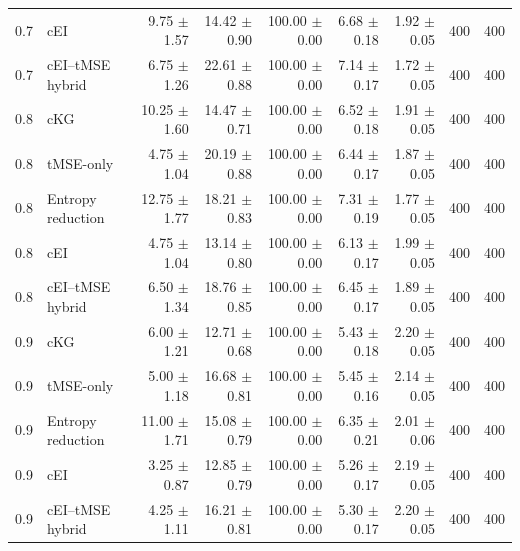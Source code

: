 \begin{tabular}{@{}clrrrrrrr@{}}
0.7 & cEI & 9.75 $\pm$ 1.57 & 14.42 $\pm$ 0.90 & 100.00 $\pm$ 0.00 & 6.68 $\pm$ 0.18 & 1.92 $\pm$ 0.05 & 400 & 400 \\
0.7 & cEI--tMSE hybrid & 6.75 $\pm$ 1.26 & 22.61 $\pm$ 0.88 & 100.00 $\pm$ 0.00 & 7.14 $\pm$ 0.17 & 1.72 $\pm$ 0.05 & 400 & 400 \\
0.8 & cKG & 10.25 $\pm$ 1.60 & 14.47 $\pm$ 0.71 & 100.00 $\pm$ 0.00 & 6.52 $\pm$ 0.18 & 1.91 $\pm$ 0.05 & 400 & 400 \\
0.8 & tMSE-only & 4.75 $\pm$ 1.04 & 20.19 $\pm$ 0.88 & 100.00 $\pm$ 0.00 & 6.44 $\pm$ 0.17 & 1.87 $\pm$ 0.05 & 400 & 400 \\
0.8 & Entropy reduction & 12.75 $\pm$ 1.77 & 18.21 $\pm$ 0.83 & 100.00 $\pm$ 0.00 & 7.31 $\pm$ 0.19 & 1.77 $\pm$ 0.05 & 400 & 400 \\
0.8 & cEI & 4.75 $\pm$ 1.04 & 13.14 $\pm$ 0.80 & 100.00 $\pm$ 0.00 & 6.13 $\pm$ 0.17 & 1.99 $\pm$ 0.05 & 400 & 400 \\
0.8 & cEI--tMSE hybrid & 6.50 $\pm$ 1.34 & 18.76 $\pm$ 0.85 & 100.00 $\pm$ 0.00 & 6.45 $\pm$ 0.17 & 1.89 $\pm$ 0.05 & 400 & 400 \\
0.9 & cKG & 6.00 $\pm$ 1.21 & 12.71 $\pm$ 0.68 & 100.00 $\pm$ 0.00 & 5.43 $\pm$ 0.18 & 2.20 $\pm$ 0.05 & 400 & 400 \\
0.9 & tMSE-only & 5.00 $\pm$ 1.18 & 16.68 $\pm$ 0.81 & 100.00 $\pm$ 0.00 & 5.45 $\pm$ 0.16 & 2.14 $\pm$ 0.05 & 400 & 400 \\
0.9 & Entropy reduction & 11.00 $\pm$ 1.71 & 15.08 $\pm$ 0.79 & 100.00 $\pm$ 0.00 & 6.35 $\pm$ 0.21 & 2.01 $\pm$ 0.06 & 400 & 400 \\
0.9 & cEI & 3.25 $\pm$ 0.87 & 12.85 $\pm$ 0.79 & 100.00 $\pm$ 0.00 & 5.26 $\pm$ 0.17 & 2.19 $\pm$ 0.05 & 400 & 400 \\
0.9 & cEI--tMSE hybrid & 4.25 $\pm$ 1.11 & 16.21 $\pm$ 0.81 & 100.00 $\pm$ 0.00 & 5.30 $\pm$ 0.17 & 2.20 $\pm$ 0.05 & 400 & 400 \\
\bottomrule
\end{tabular}
\smallskip

